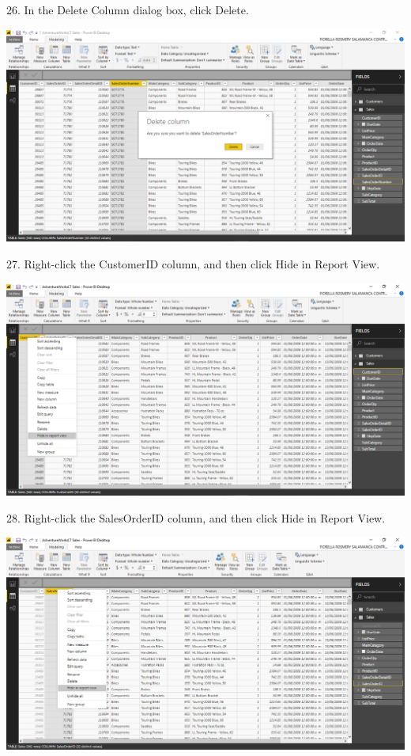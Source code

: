 26. In the Delete Column dialog box, click Delete.\\

	\begin{center}
	\includegraphics[width=17cm]{./Imagenes/Ejercicio1/Tarea3/23}
	\end{center}	

27. Right-click the CustomerID column, and then click Hide in Report View.\\

	\begin{center}
	\includegraphics[width=17cm]{./Imagenes/Ejercicio1/Tarea3/24}
	\end{center}	

28. Right-click the SalesOrderID column, and then click Hide in Report View.\\

	\begin{center}
	\includegraphics[width=17cm]{./Imagenes/Ejercicio1/Tarea3/25}
	\end{center}	

